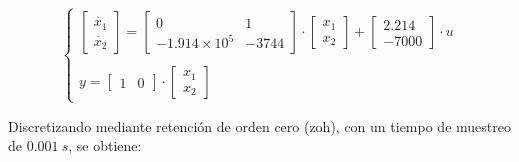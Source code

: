 \vspace{-0.5cm}
\begin{equation}
    \begin{cases}
        \begin{bmatrix}
            \dot{x_1}   \\
            \dot{x_2}   
        \end{bmatrix}
        =

        \begin{bmatrix}
            0   &   1 \\
            -1.914 \times 10^5   &  -3744           
        \end{bmatrix}

        \cdot
        \begin{bmatrix}
            x_1 \\
            x_2 
        \end{bmatrix}
        +
        \begin{bmatrix}
            2.214 \\
            -7000           
        \end{bmatrix}
        \cdot
        u 
        \\
        \\
        y =
        \begin{bmatrix}
            1 & 0
        \end{bmatrix}
        \cdot
        \begin{bmatrix}
            x_1 \\
            x_2
        \end{bmatrix}

    \end{cases}
    \label{eq:modelo_continuo}
\end{equation}
\vspace{-0.5cm}

Discretizando mediante retención de orden cero (zoh), con un tiempo de muestreo de $0.001\ s$, se obtiene:

